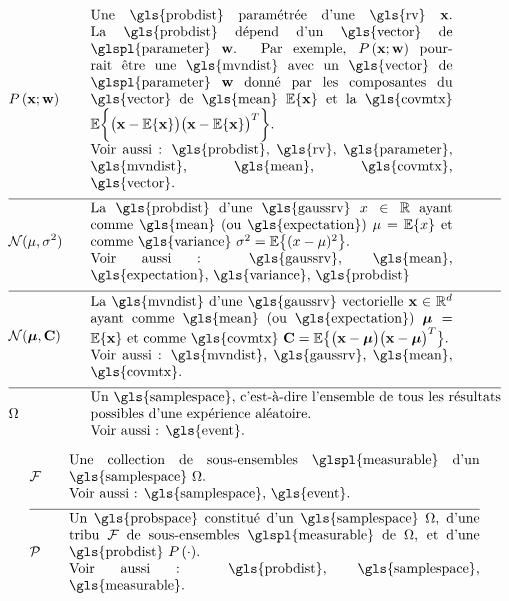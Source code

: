 \begin{align}
	&\prob{\featurevec;\weights} & \quad & \parbox{.75\textwidth}{
		Une \gls{probdist} paramétrée d'une \gls{rv} $\featurevec$. 
		La \gls{probdist} dépend d'un \gls{vector} de \glspl{parameter} $\weights$. Par exemple, $\prob{\featurevec;\weights}$ pourrait être une 
		\gls{mvndist} avec un \gls{vector} de \glspl{parameter} $\weights$ donné par les composantes du \gls{vector} de \gls{mean} $\expect \{ \featurevec \}$ 
		et la \gls{covmtx} $\expect \bigg \{ \big( \featurevec - \expect \{ \featurevec \}\big) \big( \featurevec - \expect \{ \featurevec \}\big)^{T}  \bigg\}$. \\
		Voir aussi : \gls{probdist}, \gls{rv}, \gls{parameter}, \gls{mvndist}, \gls{mean}, \gls{covmtx}, \gls{vector}.} \nonumber \\[2mm] \hline \nonumber\\[-5mm]
	&\mathcal{N}(\mu, \sigma^{2}) & \quad & \parbox{.75\textwidth}{
		La \gls{probdist} d'une 
		\gls{gaussrv} $\feature \in \mathbb{R}$ ayant comme \gls{mean} (ou \gls{expectation}) $\mu= \expect \{ \feature \}$ 
		et comme \gls{variance} $\sigma^{2} =   \expect \big\{  (  \feature - \mu )^2 \big\}$. \\
		Voir aussi : \gls{gaussrv}, \gls{mean}, \gls{expectation}, \gls{variance}, \gls{probdist}
	} \nonumber \\[2mm] \hline \nonumber\\[-5mm]
	&\mathcal{N}(\meanvecgeneric, \mathbf{C}) & \quad & \parbox{.75\textwidth}{
		La \gls{mvndist} d'une \gls{gaussrv} vectorielle 
		$\featurevec \in \mathbb{R}^{\featuredim}$ ayant comme \gls{mean} (ou \gls{expectation}) $\meanvecgeneric= \expect \{ \featurevec \}$ 
		et comme \gls{covmtx} $\mathbf{C} =  \expect \big\{ \big( \featurevec - \meanvecgeneric \big)\big( \featurevec - \meanvecgeneric \big)^{T} \big\}$. \\
		Voir aussi : \gls{mvndist}, \gls{gaussrv}, \gls{mean}, \gls{covmtx}.} \nonumber \\[2mm] \hline \nonumber\\[-5mm]
	&\Omega &\quad & \parbox{.85\textwidth}{Un \gls{samplespace}, c’est-à-dire l’ensemble de tous les résultats possibles d’une expérience aléatoire. \\ Voir aussi : \gls{event}.}  \nonumber
\end{align}

\begin{align}
	&\mathcal{F} &\quad & \parbox{.85\textwidth}{Une collection de sous-ensembles \glspl{measurable} d’un \gls{samplespace} $\Omega$. \\ Voir aussi : \gls{samplespace}, \gls{event}.}  \nonumber \\[2mm] \hline \nonumber\\[-5mm]
	&\mathcal{P} &\quad & \parbox{.85\textwidth}{Un \gls{probspace} constitué d’un \gls{samplespace} $\Omega$, d’une tribu $\mathcal{F}$ de sous-ensembles \glspl{measurable} de $\Omega$, et d’une \gls{probdist} $\prob{\cdot}$. \\ Voir aussi : \gls{probdist}, \gls{samplespace}, \gls{measurable}.} \nonumber
\end{align}


